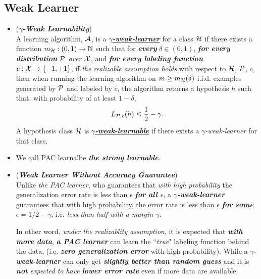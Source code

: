 \documentclass[11pt]{article}
\begin{document}
\subsection{Weak Learner}
\begin{itemize}
\item  \begin{definition}(\textbf{\emph{$\gamma$-Weak Learnability}})  \citep{schapire2012boosting, shalev2014understanding} \\
A learning algorithm, ${\mathcal A}$, is a \underline{\textbf{\emph{$\gamma$-weak-learner}}} for a class ${\mathcal H}$ if there exists a function  $m_{{\mathcal H}}: (0,1) \to {\mathbb N}$ such that for \emph{\textbf{every}} $\delta \in (0,1)$, \emph{\textbf{for every distribution} ${\mathcal P}$ over ${\mathcal X}$}, and \emph{\textbf{for every labeling function}} $c: {\mathcal X} \to \left\{-1, +1\right\}$, if \emph{the realizable assumption  holds} with respect to ${\mathcal H}$, ${\mathcal P}$, $c$, then when running the learning algorithm on $m \ge m_{{\mathcal H}}(\delta)$ i.i.d. examples generated by ${\mathcal P}$ and labeled by $c$, the algorithm returns a hypothesis $h$ such that, with probability of at least $1- \delta$,
\begin{align*}
L_{{\mathcal P}, c}(h) \le \frac{1}{2}  - \gamma.
\end{align*} A hypothesis class ${\mathcal H}$ is \underline{\textbf{\emph{$\gamma$-weak-learnable}}} if there exists a \emph{$\gamma$-weak-learner} for that class.
\end{definition}

\item \begin{remark}
We call PAC learnalbe \emph{\textbf{the strong learnable}}.
\end{remark}

\item \begin{remark} (\textbf{\emph{Weak Learner Without Accuracy Guarantee}})\\
Unlike \emph{the PAC learner}, who guarantees that \emph{with high probability} the generalization error rate is less than $\epsilon$ \emph{\textbf{for all $\epsilon$}}, a \emph{\textbf{$\gamma$-weak-learner}} guarantees that with high probability, the error rate is less than $\epsilon$ \underline{\textbf{\emph{for some}} $\epsilon = 1/2 - \gamma$}, i.e. \emph{less than half with a margin $\gamma$}.

In other word, \emph{under the realizablity assumption}, it is expected that \textit{\textbf{with more data}}, \emph{\textbf{a PAC learner}} can learn the ``\emph{true}" labeling function behind the data, (i.e. \emph{\textbf{zero generalization error}} with high probability). While a \emph{\textbf{$\gamma$-weak-learner}} can only get \emph{\textbf{slightly better than random guess}} and it is \emph{\textbf{not} expected to have \textbf{lower error rate}} even if more data are available.
\end{remark}


\end{itemize}
\end{document}
